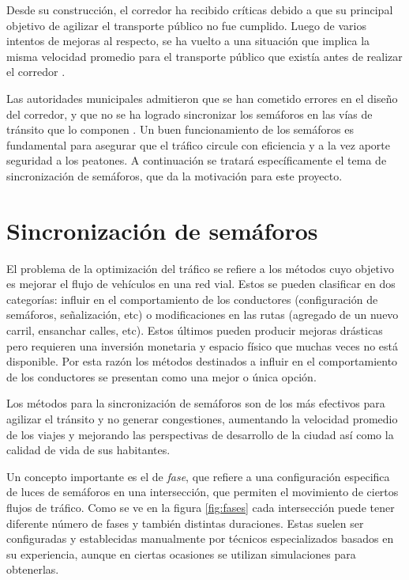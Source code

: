 Desde su construcción, el corredor ha recibido críticas debido a que su principal objetivo de agilizar el transporte público no fue cumplido. Luego de varios intentos de mejoras al respecto, se ha vuelto a una situación que implica la misma velocidad promedio para el transporte público que existía antes de realizar el corredor \citep{olivera2015}.

Las autoridades municipales admitieron que se han cometido errores en el diseño del corredor, y que no se ha logrado sincronizar los semáforos en las vías de tránsito que lo componen \citep{olivera2013}. Un buen funcionamiento de los semáforos es fundamental para asegurar que el tráfico circule con eficiencia y a la vez aporte seguridad a los peatones. A continuación se tratará específicamente el tema de sincronización de semáforos, que da la motivación para este proyecto. 


\section{Sincronización de semáforos}
El problema de la optimización del tráfico se refiere a los métodos cuyo objetivo es mejorar el flujo de vehículos en una red vial. Estos se pueden clasificar en dos categorías: influir en el comportamiento de los conductores (configuración de semáforos, señalización, etc) o modificaciones en las rutas (agregado de un nuevo carril, ensanchar calles, etc). 
Estos últimos pueden producir mejoras drásticas pero requieren una inversión monetaria y espacio físico que muchas veces no está disponible. Por esta razón los métodos destinados a influir en el comportamiento de los conductores se presentan como una mejor o única opción.

Los métodos para la sincronización de semáforos son de los más efectivos para agilizar el tránsito y no generar congestiones, aumentando la velocidad promedio de los viajes y mejorando las perspectivas de desarrollo de la ciudad así como la calidad de vida de sus habitantes. 

Un concepto importante es el de \emph{fase}, que refiere a una configuración especifica de luces de semáforos en una intersección, que permiten el movimiento de ciertos flujos de tráfico. Como se ve en la figura \ref{fig:fases} cada intersección puede tener diferente número de fases y también distintas duraciones. Estas suelen ser configuradas y establecidas manualmente por técnicos especializados basados en su experiencia, aunque en ciertas ocasiones se utilizan simulaciones para obtenerlas. 

